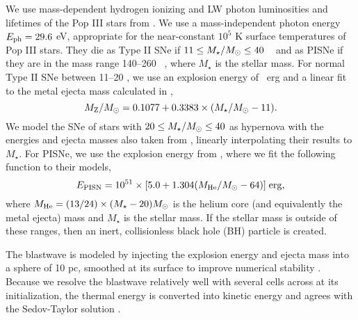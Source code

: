 \documentclass[apjl]{emulateapj}
\begin{document}
We use mass-dependent hydrogen ionizing and LW photon luminosities and
lifetimes of the Pop III stars from \citet{Schaerer02}.  We use a
mass-independent photon energy $E_{\rm ph} = 29.6$ eV, appropriate for
the near-constant $10^5$ K surface temperatures of Pop III stars.
They die as Type II SNe if $11 \le M_\star/\Ms \le 40$
\Ms~\citep{Woosley95} and as PISNe if they are in the mass range
140--260 \Ms~\citep{Heger03}, where $M_\star$ is the stellar mass.
For normal Type II SNe between 11--20 \Ms, we use an explosion energy
of ~erg and a linear fit to the metal ejecta mass calculated
in \citet{Nomoto06},
%
\begin{equation}
  \label{eqn:typeii}
  M_{\rm Z}/\Ms = 0.1077 + 0.3383 \times (M_\star/\Ms - 11).
\end{equation}
%
We model the SNe of stars with $20 \le M_\star/\Ms \le 40$ as
hypernova with the energies and ejecta masses also taken from
\citeauthor{Nomoto06}, linearly interpolating their results to
$M_\star$.  For PISNe, we use the explosion energy from
\citet{Heger02}, where we fit the following function to their models,
%
\begin{equation}
  \label{eqn:pisn}
  E_{\rm PISN} = 10^{51} \times [5.0 + 1.304 (M_{\rm He}/\Ms - 64)] \; \mathrm{erg},
\end{equation}
%
where $M_{\rm He} = (13/24) \times (M_\star - 20) \Ms$ is the helium
core (and equivalently the metal ejecta) mass and $M_\star$ is the
stellar mass.  If the stellar mass is outside of these ranges, then an
inert, collisionless black hole (BH) particle is created.

The blastwave is modeled by injecting the explosion energy and ejecta
mass into a sphere of 10 pc, smoothed at its surface to improve
numerical stability \citep{Wise08_Gal}.  Because we resolve the
blastwave relatively well with several cells across at its
initialization, the thermal energy is converted into kinetic energy
and agrees with the Sedov-Taylor solution \citep[e.g.][]{Greif07}.
\end{document}

